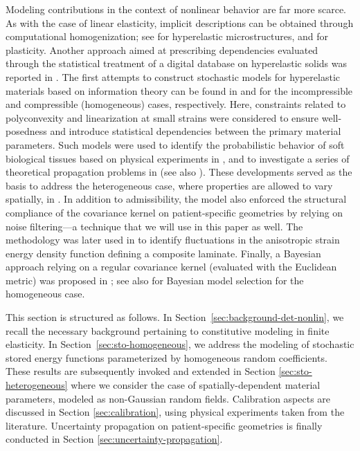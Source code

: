 Modeling contributions in the context of nonlinear behavior are far more scarce. As with the case of linear elasticity, implicit descriptions can be obtained through computational homogenization; see \cite{Clement2012,Clement2013} for hyperelastic microstructures, and \cite{OZTURK2021104294} for plasticity. Another approach aimed at prescribing dependencies evaluated through the statistical treatment of a digital database on hyperelastic solids was reported in \cite{caylak2018stochastic}. The first attempts to construct stochastic models for hyperelastic materials based on information theory can be found in \cite{staber2015stochastic} and \cite{Staber2017zamm} for the incompressible and compressible (homogeneous) cases, respectively. Here, constraints related to polyconvexity and linearization at small strains were considered to ensure well-posedness and introduce statistical dependencies between the primary material parameters. Such models were used to identify the probabilistic behavior of soft biological tissues based on physical experiments in \cite{STABER2017743}, and to investigate a series of theoretical propagation problems in \cite{Mihai-1, Mihai-2, Mihai-3, Mihai-4} (see also \cite{mihai2018stochastic}). These developments served as the basis to address the heterogeneous case, where properties are allowed to vary spatially, in \cite{STABER201894}. In addition to admissibility, the model also enforced the structural compliance of the covariance kernel on patient-specific geometries by relying on noise filtering---a technique that we will use in this paper as well. The methodology was later used in \cite{staber2019stochastic} to identify fluctuations in the anisotropic strain energy density function defining a composite laminate. Finally, a Bayesian approach relying on a regular covariance kernel (evaluated with the Euclidean metric) was proposed in \cite{Biehler2015}; see also \cite{fitt2019uncertainty} for Bayesian model selection for the homogeneous case.

This section is structured as follows. In Section~\ref{sec:background-det-nonlin}, we recall the necessary background pertaining to constitutive modeling in finite elasticity. In Section~\ref{sec:sto-homogeneous}, we address the modeling of stochastic stored energy functions parameterized by homogeneous random coefficients. These results are subsequently invoked and extended in Section \ref{sec:sto-heterogeneous} where we consider the case of spatially-dependent material parameters, modeled as non-Gaussian random fields. Calibration aspects are discussed in Section \ref{sec:calibration}, using physical experiments taken from the literature. Uncertainty propagation on patient-specific geometries is finally conducted in Section \ref{sec:uncertainty-propagation}.

